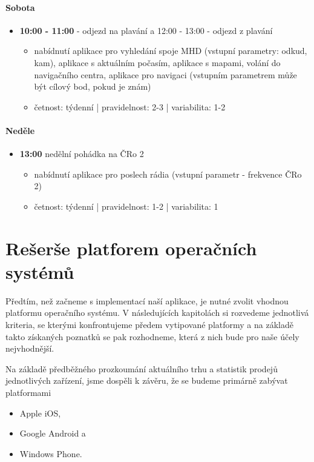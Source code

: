 \documentclass[thesis=M,czech]{FITthesis}[2012/06/26]
\begin{document}
\paragraph{Sobota}
\begin{itemize}
    \item \textbf{10:00 - 11:00} - odjezd na plavání a 12:00 - 13:00 - odjezd z plavání
\begin{itemize}
        \item nabídnutí aplikace pro vyhledání spoje MHD (vstupní parametry: odkud, kam), aplikace s aktuálním počasím, aplikace s mapami, volání do navigačního centra, aplikace pro navigaci (vstupním parametrem může být cílový bod, pokud je znám)

        \item četnost: týdenní | pravidelnost: 2-3 | variabilita: 1-2
\end{itemize}
\end{itemize}

\paragraph{Neděle}
\begin{itemize}
    \item \textbf{13:00} nedělní pohádka na ČRo 2
\begin{itemize}
        \item nabídnutí aplikace pro poslech rádia (vstupní parametr - frekvence ČRo 2)

        \item četnost: týdenní | pravidelnost: 1-2 | variabilita: 1
\end{itemize}
\end{itemize}

\section{Rešerše platforem operačních systémů}
Předtím, než začneme s implementací naší aplikace, je nutné zvolit vhodnou platformu operačního systému. V následujících kapitolách si rozvedeme jednotlivá kriteria, se kterými konfrontujeme předem vytipované platformy a na základě takto získaných poznatků se pak rozhodneme, která z nich bude pro naše účely nejvhodnější.

Na základě předběžného prozkoumání aktuálního trhu a statistik prodejů jednotlivých zařízení, jsme dospěli k závěru, že se budeme primárně zabývat platformami

\begin{itemize}
\item    Apple iOS,
\item    Google Android a
\item    Windows Phone.
\end{itemize}
\end{document}
